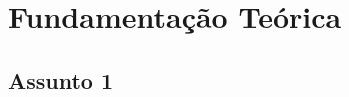 

\section{Fundamentação Teórica}
    \label{sec:fundamentacao-teorica}

    
    \subsection{Assunto 1}
        \label{subsec:assunto-1}
